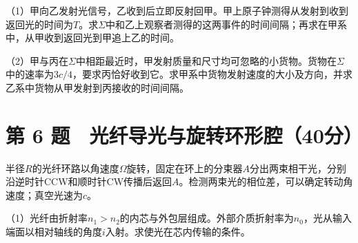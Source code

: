 \documentclass[12pt,a4paper,fontset=fandol]{ctexart}
\begin{document}
（1）甲向乙发射光信号，乙收到后立即反射回甲。甲上原子钟测得从发射到收到返回光的时间为\(T\)。求\(\Sigma\)中和乙上观察者测得的这两事件的时间间隔；再求在甲系中，从甲收到返回光到甲追上乙的时间。

（2）甲与丙在\(\Sigma\)中相距最近时，甲发射质量和尺寸均可忽略的小货物。货物在\(\Sigma\)中的速率为\(3c/4\)，要求丙恰好收到它。求甲系中货物发射速度的大小及方向，并求乙系中货物从甲发射到丙接收的时间间隔。

\clearpage

\section{第 6
题　光纤导光与旋转环形腔（40分）}\label{ux7b2c-6-ux9898-ux5149ux7ea4ux5bfcux5149ux4e0eux65cbux8f6cux73afux5f62ux815440ux5206}

半径\(R\)的光纤环路以角速度\(\Omega\)旋转，固定在环上的分束器\(A\)分出两束相干光，分别沿逆时针CCW和顺时针CW传播后返回\(A\)。检测两束光的相位差，可以确定转动角速度；真空光速为\(c\)。

\begin{center}
\begin{minipage}{\linewidth}
\centering\begingroup{}
\ifdim\wd\diagrambox>.88\linewidth
\sbox{\diagrambox}{\resizebox{.88\linewidth}{!}{\usebox{\diagrambox}}}\fi
\ifdim\ht\diagrambox>.20\textheight
\resizebox{!}{.20\textheight}{\usebox{\diagrambox}}
\else\usebox{\diagrambox}\fi
\par{}\endgroup\end{minipage}\end{center}

（1）光纤由折射率\(n_1>n_2\)的内芯与外包层组成。外部介质折射率为\(n_0\)，光从输入端面以相对轴线的角度\(i\)入射。求使光在芯内传输的条件。
\end{document}
